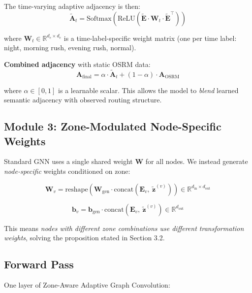 \documentclass[12pt,a4paper]{article}
\begin{document}
The time-varying adaptive adjacency is then:
\begin{equation}
\tilde{\mathbf{A}}_t = \text{Softmax}\!\left(\text{ReLU}\!\left(
\tilde{\mathbf{E}} \cdot \mathbf{W}_t \cdot \tilde{\mathbf{E}}^\top
\right)\right)
\end{equation}

where $\mathbf{W}_t \in \mathbb{R}^{d_e \times d_e}$ is a time-label-specific
weight matrix (one per time label: night, morning rush, evening rush, normal).

\textbf{Combined adjacency} with static OSRM data:
\begin{equation}
\mathbf{A}_{\text{final}} = \alpha \cdot \tilde{\mathbf{A}}_t + (1-\alpha) \cdot \mathbf{A}_{\text{OSRM}}
\end{equation}

where $\alpha \in [0,1]$ is a learnable scalar. This allows the model to
\textit{blend} learned semantic adjacency with observed routing structure.

\subsection{Module 3: Zone-Modulated Node-Specific Weights}

Standard GNN uses a single shared weight $\mathbf{W}$ for all nodes.
We instead generate \textit{node-specific} weights conditioned on zone:

\begin{equation}
\mathbf{W}_v = \text{reshape}\!\left(
\mathbf{W}_{\text{gen}} \cdot \text{concat}(\mathbf{E}_v,\ \tilde{\mathbf{z}}^{(v)})
\right) \in \mathbb{R}^{d_{\text{in}} \times d_{\text{out}}}
\end{equation}

\begin{equation}
\mathbf{b}_v = \mathbf{b}_{\text{gen}} \cdot \text{concat}(\mathbf{E}_v,\ \tilde{\mathbf{z}}^{(v)})
\in \mathbb{R}^{d_{\text{out}}}
\end{equation}

This means \textit{nodes with different zone combinations use different
transformation weights}, solving the proposition stated in Section 3.2.

\subsection{Forward Pass}

One layer of Zone-Aware Adaptive Graph Convolution:
\end{document}
